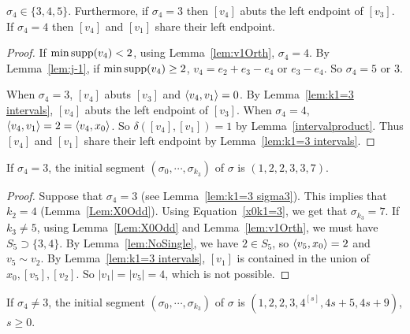\begin{lemma}\label{lem:k1=3 sigma3}
		$\sigma_4 \in \{3,4,5\}$. Furthermore, if $\sigma_4 = 3$ then $[v_4]$ abuts the left endpoint of $[v_3]$. If $\sigma_4 = 4$ then $[v_4]$ and $[v_1]$ share their left endpoint.%
\end{lemma}

\begin{proof}
If  $\min\operatorname{supp}(v_4)<2$,  using Lemma~\ref{lem:v1Orth},  $\sigma_4=4$. By Lemma~\ref{lem:j-1}, if $\min\operatorname{supp}(v_4)\ge2$, $v_4=e_2+e_3-e_4$ or $e_3-e_4$. So $\sigma_4=5$ or $3$.

When $\sigma_4=3$, $[v_4]$ abuts $[v_3]$ and $\left\langle v_4 , v_1 \right\rangle=0$. By Lemma~\ref{lem:k1=3 intervals}, $[v_4]$ abuts the left endpoint of $[v_3]$.
When $\sigma_4 = 4$, $\left\langle v_4 , v_1 \right\rangle=2=\left\langle v_4 , x_0 \right\rangle$. So $\delta([v_4],[v_1])=1$ by Lemma~\ref{intervalproduct}. Thus  $[v_4]$ and $[v_1]$ share their left endpoint by Lemma~\ref{lem:k1=3 intervals}.
\end{proof}



\begin{prop}\label{prop1:k1=3}
If $\sigma_4=3$, the initial segment $(\sigma_0, \cdots, \sigma_{k_3})$ of $\sigma$ is $(1,2,2,3,3,7)$. 
\end{prop}
\begin{proof}
Suppose that $\sigma_4=3$ (see Lemma~\ref{lem:k1=3 sigma3}). This implies that $k_2=4$ (Lemma~\ref{Lem:X0Odd}). Using Equation~\eqref{x0k1=3}, we get that $\sigma_{k_3}=7$. If $k_3\not = 5$, using Lemma~\ref{Lem:X0Odd} and  Lemma~\ref{lem:v1Orth}, we must have $S_5\supset\{3,4\}$. By Lemma~\ref{lem:NoSingle}, we have $2\in S_5$, so $\left\langle v_5 , x_0 \right\rangle=2$ and $v_5\sim v_2$. By Lemma~\ref{lem:k1=3 intervals}, $[v_1]$ is contained in the union of $x_0,[v_5],[v_2]$. So $|v_1|=|v_5|=4$, which is not possible.
\end{proof}

\begin{prop}\label{prop2:k1=3}
If $\sigma_4\neq 3$, the initial segment $(\sigma_0, \cdots, \sigma_{k_3})$ of $\sigma$ is $(1,2,2,3,4^{[s]},4s+5, 4s+9)$, $s\ge0$. 
\end{prop}

